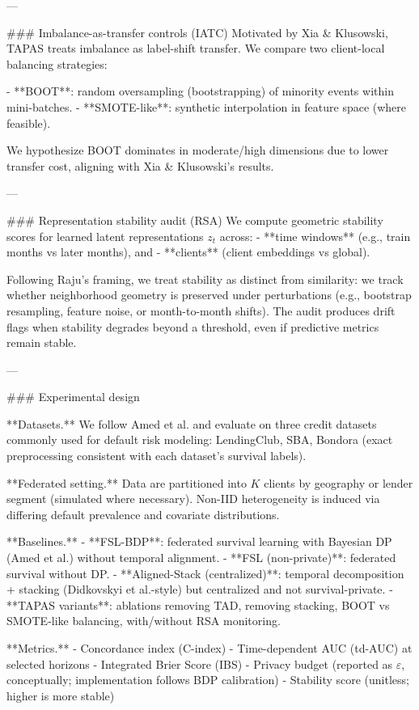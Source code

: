---

### Imbalance-as-transfer controls (IATC)  
Motivated by Xia & Klusowski, TAPAS treats imbalance as label-shift transfer. We compare two client-local balancing strategies:

- **BOOT**: random oversampling (bootstrapping) of minority events within mini-batches.  
- **SMOTE-like**: synthetic interpolation in feature space (where feasible).

We hypothesize BOOT dominates in moderate/high dimensions due to lower transfer cost, aligning with Xia & Klusowski’s results.

---

### Representation stability audit (RSA)  
We compute geometric stability scores for learned latent representations \(z_t\) across:
- **time windows** (e.g., train months vs later months), and  
- **clients** (client embeddings vs global).

Following Raju’s framing, we treat stability as distinct from similarity: we track whether neighborhood geometry is preserved under perturbations (e.g., bootstrap resampling, feature noise, or month-to-month shifts). The audit produces drift flags when stability degrades beyond a threshold, even if predictive metrics remain stable.

---

### Experimental design  

**Datasets.** We follow Amed et al. and evaluate on three credit datasets commonly used for default risk modeling: LendingClub, SBA, Bondora (exact preprocessing consistent with each dataset’s survival labels).  

**Federated setting.** Data are partitioned into \(K\) clients by geography or lender segment (simulated where necessary). Non-IID heterogeneity is induced via differing default prevalence and covariate distributions.

**Baselines.**  
- **FSL-BDP**: federated survival learning with Bayesian DP (Amed et al.) without temporal alignment.  
- **FSL (non-private)**: federated survival without DP.  
- **Aligned-Stack (centralized)**: temporal decomposition + stacking (Didkovskyi et al.-style) but centralized and not survival-private.  
- **TAPAS variants**: ablations removing TAD, removing stacking, BOOT vs SMOTE-like balancing, with/without RSA monitoring.

**Metrics.**  
- Concordance index (C-index)  
- Time-dependent AUC (td-AUC) at selected horizons  
- Integrated Brier Score (IBS)  
- Privacy budget (reported as \(\varepsilon\), conceptually; implementation follows BDP calibration)  
- Stability score (unitless; higher is more stable)

